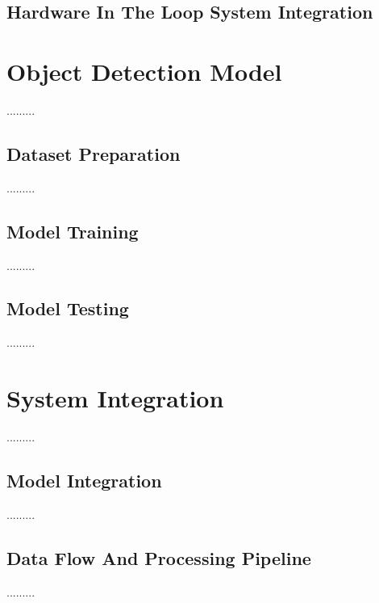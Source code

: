 \subsection{Hardware In The Loop System Integration}



\section{Object Detection Model}
.........
\subsection{Dataset Preparation}
.........
\subsection{Model Training}
.........
\subsection{Model Testing}
.........



\section{System Integration}
.........
\subsection{Model Integration}
.........
\subsection{Data Flow And Processing Pipeline}
.........

